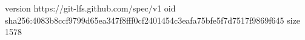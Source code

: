 version https://git-lfs.github.com/spec/v1
oid sha256:4083b8ccf9799d65ea347f8fff0cf2401454c3eafa75bfe5f7d7517f9869f645
size 1578
